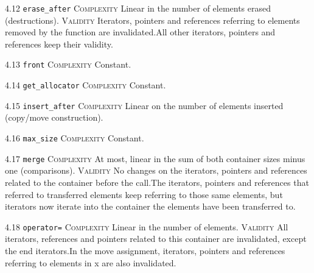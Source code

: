 \noindent\textcolor{corange}{4.12 \texttt{erase\_after}} \textsc{Complexity} Linear in the number of elements erased (destructions). \textsc{Validity} Iterators, pointers and references referring to elements removed by the function are invalidated.All other iterators, pointers and references keep their validity.\vspace{0.5em}

\noindent\textcolor{cgreen}{4.13 \texttt{front}} \textsc{Complexity} Constant. \vspace{0.5em}

\noindent\textcolor{cgreen}{4.14 \texttt{get\_allocator}} \textsc{Complexity} Constant. \vspace{0.5em}

\noindent\textcolor{corange}{4.15 \texttt{insert\_after}} \textsc{Complexity} Linear on the number of elements inserted (copy/move construction). \vspace{0.5em}

\noindent\textcolor{cgreen}{4.16 \texttt{max\_size}} \textsc{Complexity} Constant. \vspace{0.5em}

\noindent\textcolor{corange}{4.17 \texttt{merge}} \textsc{Complexity} At most, linear in the sum of both container sizes minus one (comparisons). \textsc{Validity} No changes on the iterators, pointers and references related to the container before the call.The iterators, pointers and references that referred to transferred elements keep referring to those same elements, but iterators now iterate into the container the elements have been transferred to.\vspace{0.5em}

\noindent\textcolor{corange}{4.18 \texttt{operator=}} \textsc{Complexity} Linear in the number of elements. \textsc{Validity} All iterators, references and pointers related to this container are invalidated, except the end iterators.In the move assignment, iterators, pointers and references referring to elements in x are also invalidated.\vspace{0.5em}

